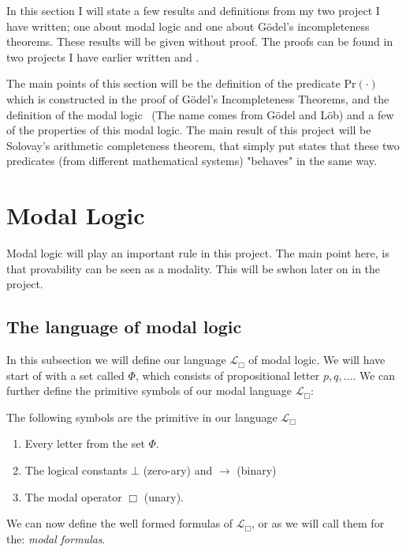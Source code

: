 \documentclass[../main.tex]{subfiles}
\begin{document}
In this section I will state a few results and definitions from my two project
I have written; one about modal logic and one about Gödel's incompleteness
theorems.
These results will be given without proof. The proofs can be found in
two projects I have earlier written \cite{Thor2021} and \cite{Thor2022}.

The main points of this section will be the definition of the predicate
$\text{Pr}(\cdot)$ which is constructed in the proof of  Gödel's Incompleteness
Theorems, and the definition of the modal logic \GL\
(The name comes from Gödel and Löb) and a few of the properties of this modal
logic. The
main result of this project will be Solovay's arithmetic completeness theorem,
that simply put states that these two predicates (from different mathematical
systems) "behaves" in the
same way.

\section{Modal Logic}
Modal logic will play an important rule in this project. The main point here,
is that provability can be seen as a modality. This will be swhon later on in
the project.

\subsection{The language of modal logic}
In this subsection we will define our language $\mathcal{L}_\Box$ of modal logic. 
We will have start of with a  set called $\Phi$, which consists of propositional letter
$p,q,\ldots$. We can further define the primitive symbols of our modal language
$\mathcal{L}_\Box$:

\begin{defi}
	The following symbols are the primitive in our language
	$\mathcal{L}_\Box$
	\begin{enumerate}
		\item Every letter from the set $\Phi$.
		\item The logical constants $\bot$ (zero-ary) and $\rightarrow$
			(binary)
		\item The modal operator $\Box$ (unary).
	\end{enumerate}
\end{defi}
We can now define the well formed formulas of $\mathcal{L}_\Box$, or as we will
call them for the: \textit{modal formulas}.
\end{document}
